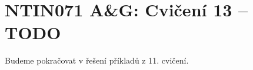\documentclass[a4paper,12pt]{amsart}
\begin{document}
\thispagestyle{empty}

\section*{NTIN071 A\&G: Cvičení 13 -- TODO}


Budeme pokračovat v řešení příkladů z 11. cvičení.

\medskip
\end{document}
